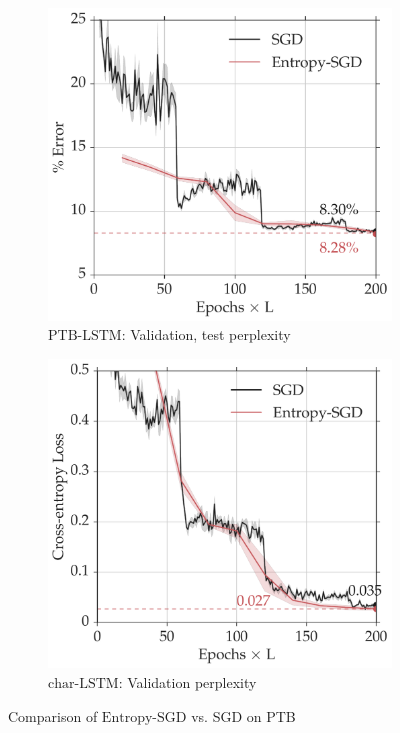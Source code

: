 \documentclass[10pt]{article}
\newcommand{\entropysgd}{\mathrm{Entropy}\textrm{-}\mathrm{SGD}}
\newcommand{\charlstm}{\textrm{char-LSTM}}
\newcommand{\ptblstm}{\textrm{PTB-LSTM}}
\begin{document}
\begin{figure}[htp!]
\centering
    \begin{subfigure}[b]{0.4\textwidth}
        \centering
        \includegraphics[width=\textwidth]{allcnn_valid.pdf}
        \caption{\small $\ptblstm$: Validation, test perplexity}
        \label{fig:ptb_valid}
    \end{subfigure}
    \hspace{0.2in}
    \begin{subfigure}[b]{0.4\textwidth}
        \centering
        \includegraphics[width=\textwidth]{allcnn_loss.pdf}
        \caption{\small $\charlstm$: Validation perplexity}
        \label{fig:char_valid}
    \end{subfigure}
\caption{\small Comparison of $\entropysgd$ vs. SGD on PTB}
\label{fig:rnn}
\end{figure}
\end{document}
